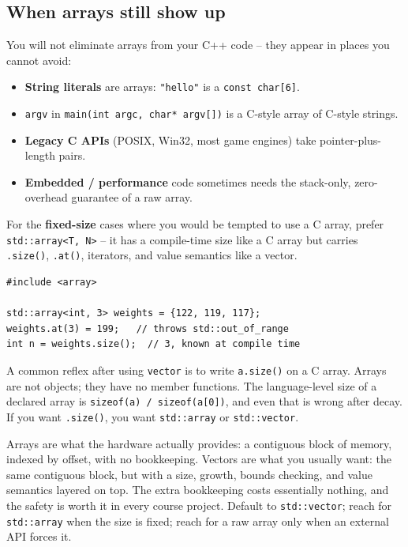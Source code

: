 \documentclass[11pt]{article}
\begin{document}
\subsection{When arrays still show up}

You will not eliminate arrays from your C++ code -- they appear in
places you cannot avoid:

\begin{itemize}[leftmargin=*]
    \item \textbf{String literals} are arrays: \texttt{"hello"} is a
          \texttt{const char[6]}.
    \item \texttt{argv} in \texttt{main(int argc, char* argv[])} is a
          C-style array of C-style strings.
    \item \textbf{Legacy C APIs} (POSIX, Win32, most game engines) take
          pointer-plus-length pairs.
    \item \textbf{Embedded / performance} code sometimes needs the
          stack-only, zero-overhead guarantee of a raw array.
\end{itemize}

For the \textbf{fixed-size} cases where you would be tempted to use a
C array, prefer \texttt{std::array<T, N>} -- it has a compile-time
size like a C array but carries \texttt{.size()}, \texttt{.at()},
iterators, and value semantics like a vector.

\begin{examplebox}
\begin{verbatim}
#include <array>

std::array<int, 3> weights = {122, 119, 117};
weights.at(3) = 199;   // throws std::out_of_range
int n = weights.size();  // 3, known at compile time
\end{verbatim}
\end{examplebox}

\begin{warnbox}
A common reflex after using \texttt{vector} is to write
\texttt{a.size()} on a C array. Arrays are not objects; they have no
member functions. The language-level size of a declared array is
\texttt{sizeof(a) / sizeof(a[0])}, and even that is wrong after decay.
If you want \texttt{.size()}, you want \texttt{std::array} or
\texttt{std::vector}.
\end{warnbox}

\begin{ideabox}
Arrays are what the hardware actually provides: a contiguous block of
memory, indexed by offset, with no bookkeeping. Vectors are what you
usually want: the same contiguous block, but with a size, growth,
bounds checking, and value semantics layered on top. The extra
bookkeeping costs essentially nothing, and the safety is worth it in
every course project. Default to \texttt{std::vector}; reach for
\texttt{std::array} when the size is fixed; reach for a raw array only
when an external API forces it.
\end{ideabox}
\end{document}
